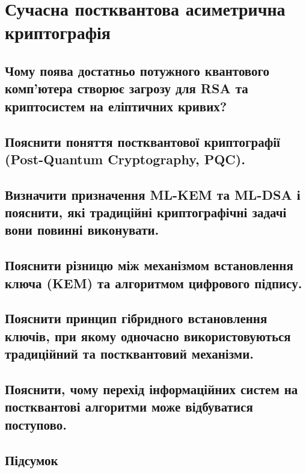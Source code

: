 \section{Сучасна постквантова асиметрична криптографія}

\subsection{Чому поява достатньо потужного квантового комп'ютера створює загрозу для RSA та криптосистем на еліптичних кривих?}

\subsection{Пояснити поняття постквантової криптографії (Post-Quantum Cryptography, PQC).}

\subsection{Визначити призначення ML-KEM та ML-DSA і пояснити, які традиційні криптографічні задачі вони повинні виконувати.}

\subsection{Пояснити різницю між механізмом встановлення ключа (KEM) та алгоритмом цифрового підпису.}

\subsection{Пояснити принцип гібридного встановлення ключів, при якому одночасно використовуються традиційний та постквантовий механізми.}

\subsection{Пояснити, чому перехід інформаційних систем на постквантові алгоритми може відбуватися поступово.}

\subsection{Підсумок}